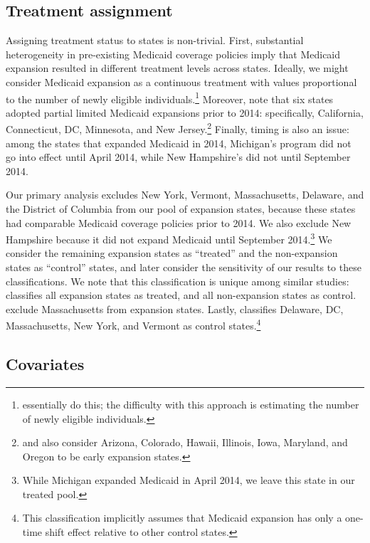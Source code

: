 \documentclass[final]{article}
\begin{document}
\subsection{Treatment assignment}

Assigning treatment status to states is non-trivial. First, substantial heterogeneity in pre-existing Medicaid coverage policies imply that Medicaid expansion resulted in different treatment levels across states. Ideally, we might consider Medicaid expansion as a continuous treatment with values proportional to the number of newly eligible individuals.\footnote{\cite{frean2017premium} essentially do this; the difficulty with this approach is estimating the number of newly eligible individuals.} Moreover, \cite{frean2017premium} note that six states adopted partial limited Medicaid expansions prior to 2014: specifically, California, Connecticut, DC, Minnesota, and New Jersey.\footnote{\cite{kaestner2017effects} and \cite{courtemanche2017early} also consider Arizona, Colorado, Hawaii, Illinois, Iowa, Maryland, and Oregon to be early expansion states.} Finally, timing is also an issue: among the states that expanded Medicaid in 2014, Michigan's program did not go into effect until April 2014, while New Hampshire's did not until September 2014.

Our primary analysis excludes New York, Vermont, Massachusetts, Delaware, and the District of Columbia from our pool of expansion states, because these states had comparable Medicaid coverage policies prior to 2014. We also exclude New Hampshire because it did not expand Medicaid until September 2014.\footnote{While Michigan expanded Medicaid in April 2014, we leave this state in our treated pool.} We consider the remaining expansion states as ``treated'' and the non-expansion states as ``control'' states, and later consider the sensitivity of our results to these classifications. We note that this classification is unique among similar studies: \cite{courtemanche2017early} classifies all expansion states as treated, and all non-expansion states as control. \cite{frean2017premium} exclude Massachusetts from expansion states. Lastly, \cite{kaestner2017effects} classifies Delaware, DC, Massachusetts, New York, and Vermont as control states.\footnote{This classification implicitly assumes that Medicaid expansion has only a one-time shift effect relative to other control states.} 

\subsection{Covariates}
\end{document}
